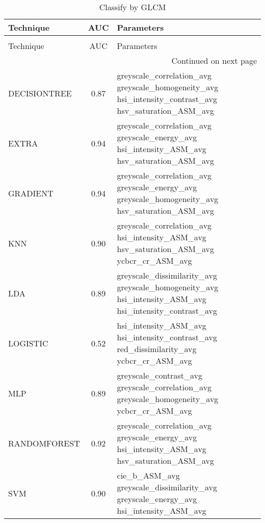 \begin{longtable}{lcl}
\caption[Classify by GLCM]{Classify by GLCM}
\label{table:results-glcm}\\
\toprule
   Technique &  AUC &                                                                                             Parameters \\
\midrule
\endfirsthead
\caption[]{Classify by GLCM} \\
\toprule
   Technique &  AUC &                                                                                             Parameters \\
\midrule
\endhead
\midrule
\multicolumn{3}{r}{{Continued on next page}} \\
\midrule
\endfoot

\bottomrule
\endlastfoot
DECISIONTREE & 0.87 &  greyscale\_correlation\_avg greyscale\_homogeneity\_avg hsi\_intensity\_contrast\_avg hsv\_saturation\_ASM\_avg \\
       EXTRA & 0.94 &            greyscale\_correlation\_avg greyscale\_energy\_avg hsi\_intensity\_ASM\_avg hsv\_saturation\_ASM\_avg \\
    GRADIENT & 0.94 &        greyscale\_correlation\_avg greyscale\_energy\_avg greyscale\_homogeneity\_avg hsv\_saturation\_ASM\_avg \\
         KNN & 0.90 &                greyscale\_correlation\_avg hsi\_intensity\_ASM\_avg hsv\_saturation\_ASM\_avg ycbcr\_cr\_ASM\_avg \\
         LDA & 0.89 & greyscale\_dissimilarity\_avg greyscale\_homogeneity\_avg hsi\_intensity\_ASM\_avg hsi\_intensity\_contrast\_avg \\
    LOGISTIC & 0.52 &                hsi\_intensity\_ASM\_avg hsi\_intensity\_contrast\_avg red\_dissimilarity\_avg ycbcr\_cr\_ASM\_avg \\
         MLP & 0.89 &            greyscale\_contrast\_avg greyscale\_correlation\_avg greyscale\_homogeneity\_avg ycbcr\_cr\_ASM\_avg \\
RANDOMFOREST & 0.92 &            greyscale\_correlation\_avg greyscale\_energy\_avg hsi\_intensity\_ASM\_avg hsv\_saturation\_ASM\_avg \\
         SVM & 0.90 &                   cie\_b\_ASM\_avg greyscale\_dissimilarity\_avg greyscale\_energy\_avg hsi\_intensity\_ASM\_avg \\
\end{longtable}
